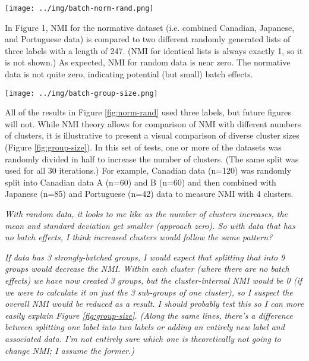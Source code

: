 \documentclass[12pt]{article}
\begin{document}
\begin{figure*}[ht]
  \centering
       \texttt{[image: ../img/batch-norm-rand.png]}
         \caption{}
  \label{fig:norm-rand}
\end{figure*}

In Figure 1, NMI for the normative dataset (i.e. combined Canadian, Japanese, and Portuguese data) is compared to two different randomly generated lists of three labels with a length of 247. (NMI for identical lists is always exactly 1, so it is not shown.) As expected, NMI for random data is near zero. The normative data is not quite zero, indicating potential (but small) batch effects.


\pagebreak

\begin{figure*}
  \centering
       \texttt{[image: ../img/batch-group-size.png]}
         \caption{}
  \label{fig:group-size}
\end{figure*}

All of the results in Figure \ref{fig:norm-rand} used three labels, but future figures will not. While NMI theory allows for comparison of NMI with different numbers of clusters, it is illustrative to present a visual comparison of diverse cluster sizes (Figure \ref{fig:group-size}). In this set of tests, one or more of the datasets was randomly divided in half to increase the number of clusters. (The same split was used for all 30 iterations.) For example, Canadian data (n=120) was randomly split into Canadian data A (n=60) and B (n=60) and then combined with Japanese (n=85) and Portuguese (n=42) data to measure NMI with 4 clusters.

\emph{With random data, it looks to me like as the number of clusters increases, the mean and standard deviation get smaller (approach zero). So with data that has no batch effects, I think increased clusters would follow the same pattern?}

\emph{If data has 3 strongly-batched groups, I would expect that splitting that into 9 groups would decrease the NMI. Within each cluster (where there are no batch effects) we have now created 3 groups, but the cluster-internal NMI would be 0 (if we were to calculate it on just the 3 sub-groups of one cluster), so I suspect the overall NMI would be reduced as a result. I should probably test this so I can more easily explain Figure \ref{fig:group-size}. (Along the same lines, there's a difference between splitting one label into two labels or adding an entirely new label and associated data. I'm not entirely sure which one is theoretically not going to change NMI; I assume the former.)}
\end{document}
